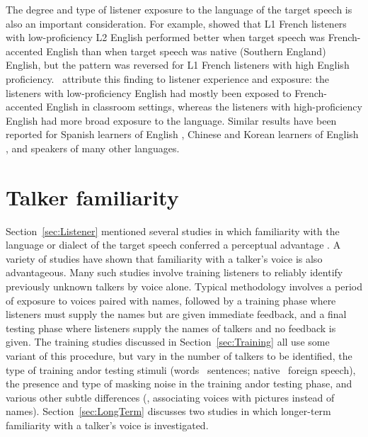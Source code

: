 The degree and type of listener exposure to the language of the target speech is also an important consideration.  For example, \citet{PinetEtAl2011} showed that L1 French listeners with low-proficiency L2 English performed better when target speech was French-accented English than when target speech was native (Southern England) English, but the pattern was reversed for L1 French listeners with high English proficiency.  \citeauthor{PinetEtAl2011}\ attribute this finding to listener experience and exposure: the listeners with low-proficiency English had mostly been exposed to French-accented English in classroom settings, whereas the listeners with high-proficiency English had more broad exposure to the language.  Similar results have been reported for Spanish learners of English \citep{ImaiEtAl2005}, Chinese and Korean learners of English \citep{BentBradlow2003}, and speakers of many other languages.%


\section{Talker familiarity\label{sec:Fam}}
Section~\ref{sec:Listener} mentioned several studies in which familiarity with the language or dialect of the target speech conferred a perceptual advantage \citep[\eg,][]{BentBradlow2003, ImaiEtAl2005, PinetEtAl2011}.  A variety of studies have shown that familiarity with a talker’s voice is also advantageous.  Many such studies involve training listeners to reliably identify previously unknown talkers by voice alone.  Typical methodology involves a period of exposure to voices paired with names, followed by a training phase where listeners must supply the names but are given immediate feedback, and a final testing phase where listeners supply the names of talkers and no feedback is given.  The training studies discussed in Section~\ref{sec:Training} all use some variant of this procedure, but vary in the number of talkers to be identified, the type of training and\slsh or testing stimuli (words \vs\ sentences; native \vs\ foreign speech), the presence and type of masking noise in the training and\slsh or testing phase, and various other subtle differences (\eg, associating voices with pictures instead of names).  Section~\ref{sec:LongTerm} discusses two studies in which longer-term familiarity with a talker’s voice is investigated.


